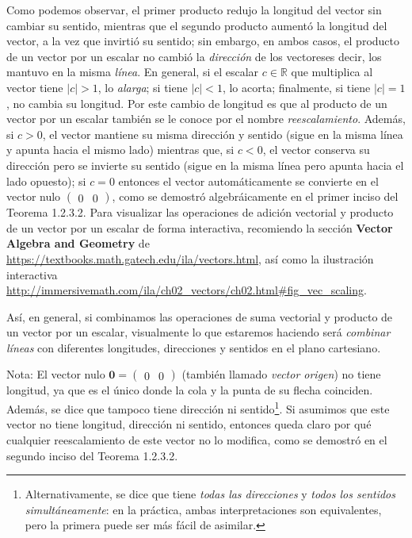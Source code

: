 \documentclass[apuntes]{subfiles}
\begin{document}
    Como podemos observar, el primer producto redujo la longitud del vector sin cambiar su sentido, mientras que el segundo producto aumentó la longitud del vector, a la vez que invirtió su sentido; sin embargo, en ambos casos, el producto de un vector por un escalar no cambió la \emph{dirección} de los vectores\textemdash es decir, los mantuvo en la misma \emph{línea}. En general, si el escalar $c\in\mathbb{R}$ que multiplica al vector tiene $|c|>1$, lo \emph{alarga}; si tiene $|c|<1$, lo acorta; finalmente, si tiene $|c|=1$, no cambia su longitud. Por este cambio de longitud es que al producto de un vector por un escalar también se le conoce por el nombre \emph{reescalamiento}. Además, si $c>0$, el vector mantiene su misma dirección y sentido (sigue en la misma línea y apunta hacia el mismo lado) mientras que, si $c<0$, el vector conserva su dirección pero se invierte su sentido (sigue en la misma línea pero apunta hacia el lado opuesto); si $c=0$ entonces el vector automáticamente se convierte en el vector nulo $\begin{pmatrix}0&0\end{pmatrix}$, como se demostró algebráicamente en el primer inciso del Teorema 1.2.3.2. Para visualizar las operaciones de adición vectorial y producto de un vector por un escalar de forma interactiva, recomiendo la sección \textbf{Vector Algebra and Geometry} de \url{https://textbooks.math.gatech.edu/ila/vectors.html}, así como la ilustración interactiva \url{http://immersivemath.com/ila/ch02_vectors/ch02.html#fig_vec_scaling}.

    Así, en general, si combinamos las operaciones de suma vectorial y producto de un vector por un escalar, visualmente lo que estaremos haciendo será \emph{combinar líneas} con diferentes longitudes, direcciones y sentidos en el plano cartesiano. 

\vspace{3mm}

Nota: El vector nulo $\mathbf{0}=\begin{pmatrix}0&0\end{pmatrix}$ (también llamado \emph{vector origen}) no tiene longitud, ya que es el único donde la cola y la punta de su flecha coinciden. Además, se dice que tampoco tiene dirección ni sentido\footnote{Alternativamente, se dice que tiene \emph{todas las direcciones} y \emph{todos los sentidos simultáneamente}: en la práctica, ambas interpretaciones son equivalentes, pero la primera puede ser más fácil de asimilar.}. Si asumimos que este vector no tiene longitud, dirección ni sentido, entonces queda claro por qué cualquier reescalamiento de este vector no lo modifica, como se demostró en el segundo inciso del Teorema 1.2.3.2.
\end{document}
